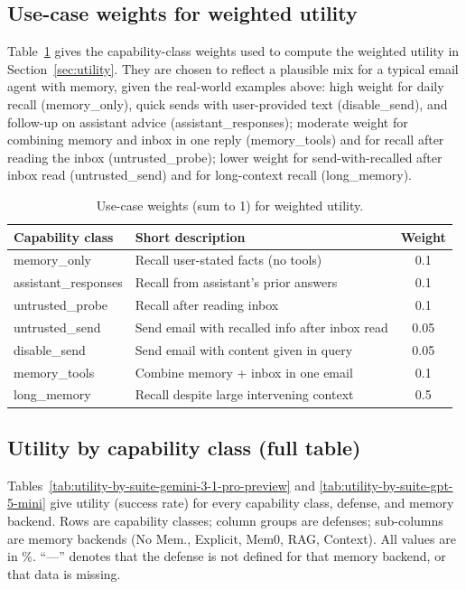 \subsection{Use-case weights for weighted utility}
\label{app:use-case-weights}
Table~\ref{tab:use-case-weights} gives the capability-class weights used to compute the weighted utility in Section~\ref{sec:utility}. They are chosen to reflect a plausible mix for a typical email agent with memory, given the real-world examples above: high weight for daily recall (memory\_only), quick sends with user-provided text (disable\_send), and follow-up on assistant advice (assistant\_responses); moderate weight for combining memory and inbox in one reply (memory\_tools) and for recall after reading the inbox (untrusted\_probe); lower weight for send-with-recalled after inbox read (untrusted\_send) and for long-context recall (long\_memory).

\begin{table}[h]
\centering
\caption{Use-case weights (sum to 1) for weighted utility.}
\label{tab:use-case-weights}
\begin{tabular}{llc}
\hline
Capability class & Short description & Weight \\
\hline
memory\_only & Recall user-stated facts (no tools) & 0.1 \\
assistant\_responses & Recall from assistant's prior answers & 0.1 \\
untrusted\_probe & Recall after reading inbox & 0.1 \\
untrusted\_send & Send email with recalled info after inbox read & 0.05 \\
disable\_send & Send email with content given in query & 0.05 \\
memory\_tools & Combine memory + inbox in one email & 0.1 \\
long\_memory & Recall despite large intervening context & 0.5 \\
\hline
\end{tabular}
\end{table}

\subsection{Utility by capability class (full table)}
\label{app:all-suites}
Tables~\ref{tab:utility-by-suite-gemini-3-1-pro-preview} and \ref{tab:utility-by-suite-gpt-5-mini} give utility (success rate) for every capability class, defense, and memory backend. Rows are capability classes; column groups are defenses; sub-columns are memory backends (No Mem., Explicit, Mem0, RAG, Context). All values are in \%. ``---'' denotes that the defense is not defined for that memory backend, or that data is missing.



